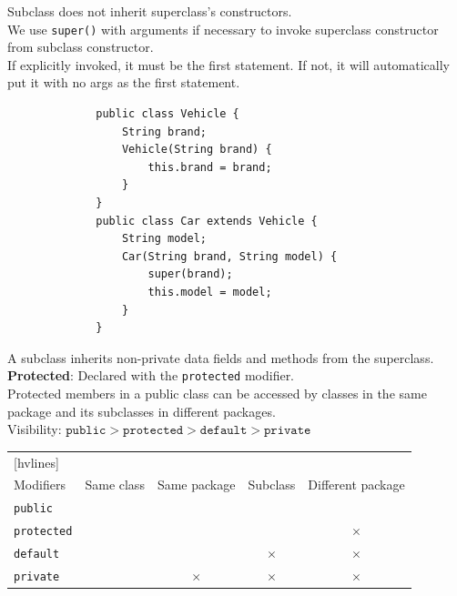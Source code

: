 \documentclass{article}
\begin{document}
Subclass does not inherit superclass's constructors.\\
We use \texttt{super()} with arguments if necessary to invoke superclass constructor from subclass constructor.\\
If explicitly invoked, it must be the first statement. If not, it will automatically put it with no args as the first statement.

\begin{figure}[h]
	\begin{verbatim}
		public class Vehicle {
		    String brand;
		    Vehicle(String brand) {
		        this.brand = brand;
		    } 
		}
		public class Car extends Vehicle {
		    String model;
		    Car(String brand, String model) {
		        super(brand);
		        this.model = model;
		    }
		}
	\end{verbatim}
\end{figure}

A subclass inherits non-private data fields and methods from the superclass.\\
\textbf{Protected}: Declared with the \texttt{protected} modifier.\\
Protected members in a public class can be accessed by classes in the same package and its subclasses in different packages.\\
Visibility: $\texttt{public} > \texttt{protected} > \texttt{default} > \texttt{private}$

\begin{table}[h!]
	\centering
	\begin{NiceTabular}{||lcccc||}[hvlines]
		\RowStyle{\bfseries} & \\
		\RowStyle{\bfseries}Modifiers & Same class & Same package & Subclass & Different package\\
		\texttt{public} & \checkmark & \checkmark & \checkmark & \checkmark\\
		\texttt{protected} & \checkmark & \checkmark & \checkmark & $\times$\\
		\texttt{default} & \checkmark & \checkmark & $\times$ & $\times$\\
		\texttt{private} & \checkmark & $\times$ & $\times$ & $\times$
	\end{NiceTabular}
\end{table}
\end{document}
